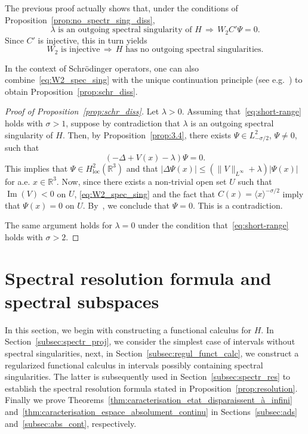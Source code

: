 \documentclass[AHL,Unicode,longabstracts,published]{cedram}
\newcommand{\R}{\mathbb{R}}
\DeclareMathOperator{\im}{Im}
\newcommand{\R}{\mathbb{R}}
\DeclareMathOperator{\im}{Im}
\begin{document}
\begin{rema}
The previous proof actually shows that, under the conditions of Proposition~\ref{prop:no_spectr_sing_diss},
\begin{equation}\label{eq:W2_spec_sing}
\lambda\text{ is an outgoing spectral singularity of }H \, \Rightarrow \, W_2C'\Psi=0.
\end{equation}
Since $C'$ is injective, this in turn yields
\begin{equation*}
W_2\text{ is injective} \, \Rightarrow \, H\text{ has no outgoing spectral singularities}.
\end{equation*}
\end{rema}

In the context of Schr\"odinger operators, one can also combine~\eqref{eq:W2_spec_sing} with the unique continuation principle (see e.g.~\cite[Theorem~XIII.63]{ReSi80_01}) to obtain Proposition~\ref{prop:schr_diss}.

\begin{proof}[Proof of Proposition~\ref{prop:schr_diss}]
Let $\lambda>0$. Assuming that~\eqref{eq:short-range} holds with $\sigma>1$, suppose by contradiction that $\lambda$ is an outgoing spectral singularity of $H$. Then, by Proposition~\ref{prop:3.4}, there exists $\Psi\in L^2_{-\sigma/2}$, $\Psi\neq0$, such that
\begin{equation*}
(-\Delta+V(x)-\lambda)\Psi=0.
\end{equation*}
This implies that $\Psi\in H^2_{\mathrm{loc}}(\R^3)$ and that $|\Delta\Psi(x)|\le (\|V\|_{L^\infty}+\lambda)|\Psi(x)|$ for a.e. $x\in\R^3$. Now, since there exists a non-trivial open set $U$ such that $\im(V)<0$ on $U$, \eqref{eq:W2_spec_sing} and the fact that $C(x)=\langle x\rangle^{-\sigma/2}$ imply that $\Psi(x)=0$ on $U$. By~\cite[Theorem~XIII.63]{ReSi80_01}, we conclude that $\Psi=0$. This is a contradiction.

The same argument holds for $\lambda=0$ under the condition that~\eqref{eq:short-range} holds with $\sigma>2$.
\end{proof}

\section{Spectral resolution formula and spectral subspaces}\label{sec:spectr_res}

In this section, we begin with constructing a functional calculus for $H$. In Section~\ref{subsec:spectr_proj}, we consider the simplest case of intervals without spectral singularities, next, in Section~\ref{subsec:regul_funct_calc}, we construct a regularized functional calculus in intervals possibly containing spectral singularities. The latter is subsequently used in Section~\ref{subsec:spectr_res} to establish the spectral resolution formula stated in Proposition~\ref{prop:resolution}. Finally we prove Theorems~\ref{thm:caracterisation_etat_disparaissent_à_infini} and~\ref{thm:caracterisation_espace_absolument_continu} in Sections~\ref{subsec:ads} and~\ref{subsec:abs_cont}, respectively.
\end{document}
